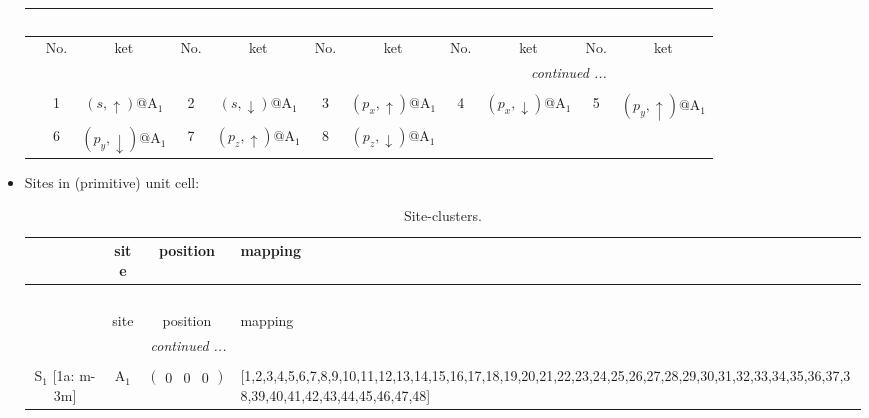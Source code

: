\documentclass[fleqn,10pt,landscape]{article}
\begin{document}
\begin{itemize}
\begin{center}
\begin{longtable}{c|cc|cc|cc|cc|cc}
\multicolumn{10}{l}{\tablename\ \thetable{}} \\
 \hline \hline
 & No. & ket & No. & ket & No. & ket & No. & ket & No. & ket \\ \hline \endhead

 \hline \hline
\multicolumn{10}{r}{\footnotesize\it continued ...} \\ \endfoot

 \hline \hline
\multicolumn{10}{r}{} \\ \endlastfoot

 & 1 & $(s,\uparrow)$@A$_{1}$ & 2 & $(s,\downarrow)$@A$_{1}$ & 3 & $(p_{x},\uparrow)$@A$_{1}$ & 4 & $(p_{x},\downarrow)$@A$_{1}$ & 5 & $(p_{y},\uparrow)$@A$_{1}$ \\
& 6 & $(p_{y},\downarrow)$@A$_{1}$ & 7 & $(p_{z},\uparrow)$@A$_{1}$ & 8 & $(p_{z},\downarrow)$@A$_{1}$ &  &  &  &  \\
\end{longtable}
\end{center}

\item Sites in (primitive) unit cell:
\begin{center}
\renewcommand{\arraystretch}{1.3}
\begin{longtable}{cc|c|l}
\caption{Site-clusters.}
 \\
 \hline \hline
 & site & position & mapping \\ \hline \endfirsthead

\multicolumn{3}{l}{\tablename\ \thetable{}} \\
 \hline \hline
 & site & position & mapping \\ \hline \endhead

 \hline \hline
\multicolumn{3}{r}{\footnotesize\it continued ...} \\ \endfoot

 \hline \hline
\multicolumn{3}{r}{} \\ \endlastfoot

S$_{1}$ [1a: m-3m] & A$_1$ & $\begin{pmatrix} 0 & 0 & 0 \end{pmatrix}$ & [1,2,3,4,5,6,7,8,9,10,11,12,13,14,15,16,17,18,19,20,21,22,23,24,25,26,27,28,29,30,31,32,33,34,35,36,37,38,39,40,41,42,43,44,45,46,47,48] \\
\end{longtable}
\end{center}


\end{itemize}
\end{document}
